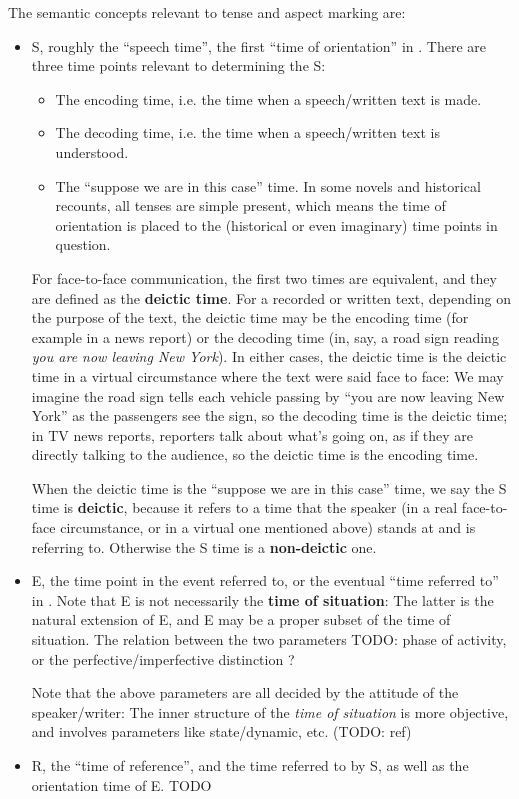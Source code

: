 \documentclass[UTF8, a4paper, oneside, scheme=plain]{ctexrep}
\newcommand*{\citepage}[1]{p.~{#1}}
\newcommand*{\concept}[1]{\textbf{#1}}
\newcommand{\corpus}[1]{\emph{#1}}
\begin{document}
The semantic concepts relevant to tense and aspect marking are:
\begin{itemize}
    \item S, roughly the ``speech time'', 
    the first ``time of orientation'' in \citet{cgel}. 
    There are three time points relevant to 
    determining the S:
    \begin{itemize}
        \item The encoding time, i.e. the time when a speech/written text is made.
        \item The decoding time, i.e. the time when a speech/written text is understood.
        \item The ``suppose we are in this case'' time.
        In some novels and historical recounts, 
        all tenses are simple present,
        which means the time of orientation is placed to 
        the (historical or even imaginary) time points in question.
    \end{itemize}
    For face-to-face communication,
    the first two times are equivalent,
    and they are defined as the \concept{deictic time}.
    For a recorded or written text,
    depending on the purpose of the text,
    the deictic time may be the encoding time 
    (for example in a news report)
    or the decoding time 
    (in, say, a road sign reading \corpus{you are now leaving New York}).
    In either cases, 
    the deictic time is the deictic time in a virtual circumstance
    where the text were said face to face: 
    We may imagine the road sign tells each vehicle passing by 
    ``you are now leaving New York''
    as the passengers see the sign,
    so the decoding time is the deictic time;
    in TV news reports, reporters talk about what's going on,
    as if they are directly talking to the audience,
    so the deictic time is the encoding time.

    When the deictic time is the ``suppose we are in this case'' time,
    we say the S time is \concept{deictic},
    because it refers to a time that the speaker 
    (in a real face-to-face circumstance,
    or in a virtual one mentioned above)
    stands at and is referring to. 
    Otherwise the S time is a \concept{non-deictic} one.
    \item E, the time point in the event referred to,
    or the eventual ``time referred to'' in \citet{cgel}.
    Note that E is not necessarily the \concept{time of situation}:
    The latter is the natural extension of E,
    and E may be a proper subset of the time of situation.
    The relation between the two parameters TODO: phase of activity, or the perfective/imperfective distinction \citep[\citepage{125}]{cgel}?

    Note that the above parameters are all decided by the attitude of the speaker/writer: 
    The inner structure of the \emph{time of situation}
    is more objective,
    and involves parameters like state/dynamic, etc. (TODO: ref)
    \item R, the ``time of reference'', and the time referred to by S, as well as the orientation time of E. TODO
\end{itemize}
\end{document}
